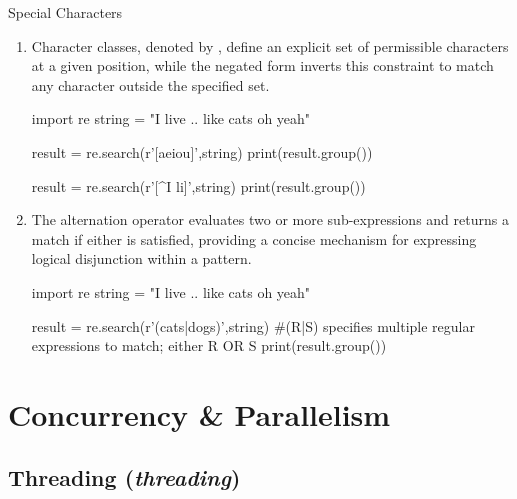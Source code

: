\documentclass[10pt]{article}
\begin{document}
\begin{core}{Special Characters}
\begin{enumerate}
      \item Character classes, denoted by \textcode{[...]}, define an explicit set of permissible characters at a given position, while the negated form \textcode{[\^{}...]} inverts this constraint to match any character outside the specified set.

      \begin{pyconsole}

        import re
        string = "I live .. like cats oh yeah"

        result = re.search(r'[aeiou]',string)
        print(result.group())

        result = re.search(r'[^I li]',string)
        print(result.group())

      \end{pyconsole}

      \item The alternation operator  evaluates two or more sub-expressions and returns a match if either is satisfied, providing a concise mechanism for expressing logical disjunction within a pattern.

      \begin{pyconsole}

        import re
        string = "I live .. like cats oh yeah"

        result = re.search(r'(cats|dogs)',string) #(R|S) specifies multiple regular expressions to match; either R OR S
        print(result.group())

      \end{pyconsole}

    \end{enumerate}

  \end{core}

\section{Concurrency \& Parallelism}

  \subsection{Threading (\textit{threading})}
    \label{sec:threading}
\end{document}
